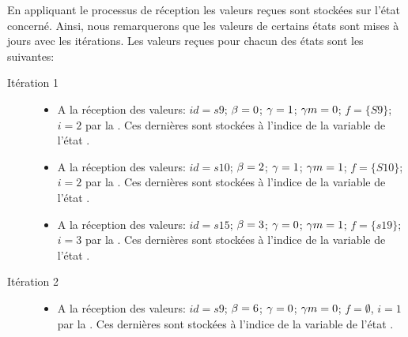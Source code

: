 \begin{Exemple}\label{ea4}
	En appliquant le processus de réception les valeurs reçues sont stockées sur l'état concerné. Ainsi, nous remarquerons que les valeurs de certains états sont mises à jours avec les itérations.  Les valeurs reçues pour chacun des états sont les suivantes:
	
	\begin{description}
	\item[Itération 1]
		\begin{itemize}
		\item A la réception des valeurs: $id =s9$; $\beta{}=0$; $\gamma{}=1$; $\gamma m{}=0$; $f =\{S9\}$; $i=2$ par la \mone{}. Ces dernières sont stockées à l'indice  de la variable   de l'état .
		
		\item A la réception des valeurs: $id =s10$; $\beta{}=2$; $\gamma{}=1$; $\gamma m{}=1$; $f =\{S10\}$; $i=2$ par la \mone{}. Ces dernières sont stockées à l'indice  de la variable   de l'état .
		
		\item A la réception des valeurs: $id =s15$; $\beta{}=3$; $\gamma{}=0$; $\gamma m{}=1$; $f =\{s19\}$; $i=3$ par la \mtwo{}. Ces dernières sont stockées à l'indice  de la variable   de l'état .
		\end{itemize}
	\item[Itération 2]
		\begin{itemize}
			\item A la réception des valeurs: $id =s9$; $\beta{} =6$; $\gamma{} =0$; $\gamma m{}=0$; $f =\emptyset$, $i=1$ par la \mtwo{}. Ces dernières sont stockées à l'indice  de la variable   de l'état .
			

\end{itemize}
\end{description}
\end{Exemple}
